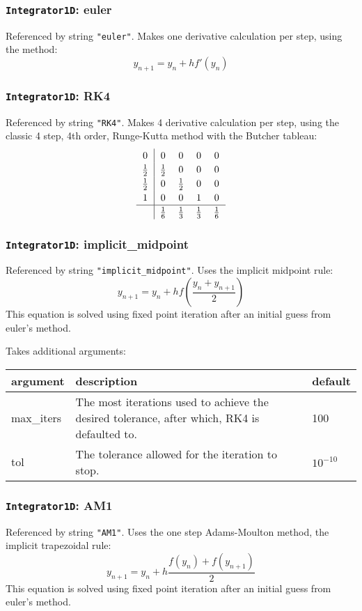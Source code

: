 \documentclass[10pt,a4paper]{article}
\newenvironment{optarglist}
    {\begin{center}
    \begin{tabular}{l|p{10cm}|l}
    argument & description & default\\
    \hline
    }
    { 
    \end{tabular} 
    \end{center}
    }
\begin{document}
\subsubsection{\texttt{Integrator1D}: euler}
Referenced by string \texttt{"euler"}. Makes one derivative calculation per step, using the method:
$$y_{n+1} =  y_{n} + hf'(y_{n})$$




\subsubsection{\texttt{Integrator1D}: RK4}
Referenced by string \texttt{"RK4"}. Makes 4 derivative calculation per step, using the classic 4 step, 4th order, Runge-Kutta method with the Butcher tableau:
\[\arraycolsep=6pt\def\arraystretch{1.2}\begin{array}{c|cccc}
0 & 0 & 0 & 0 & 0\\
\frac12 & \frac12 & 0 & 0 & 0\\
\frac12 & 0 & \frac12 & 0 & 0\\
1 & 0 & 0 & 1 & 0\\
\hline
&\frac16 & \frac13 & \frac13 & \frac16
\end{array}
\]



\subsubsection{\texttt{Integrator1D}: implicit\_midpoint}
Referenced by string \texttt{"implicit\_midpoint"}. Uses the implicit midpoint rule:
$$y_{n+1} = y_n + hf\left(\frac{y_n + y_{n+1}}{2}\right)$$
This equation is solved using fixed point iteration after an initial guess from euler's method.

Takes additional arguments:

\begin{optarglist}
max\_iters & The most iterations used to achieve the desired tolerance, after which, RK4 is defaulted to. & 100\\\hline
tol & The tolerance allowed for the iteration to stop. & $10^{-10}$
\end{optarglist}




\subsubsection{\texttt{Integrator1D}: AM1}
Referenced by string \texttt{"AM1"}. Uses the one step Adams-Moulton method, the implicit trapezoidal rule:
$$y_{n+1} = y_n + h\frac{f(y_n) + f(y_{n+1})}{2}$$
This equation is solved using fixed point iteration after an initial guess from euler's method.
\end{document}
